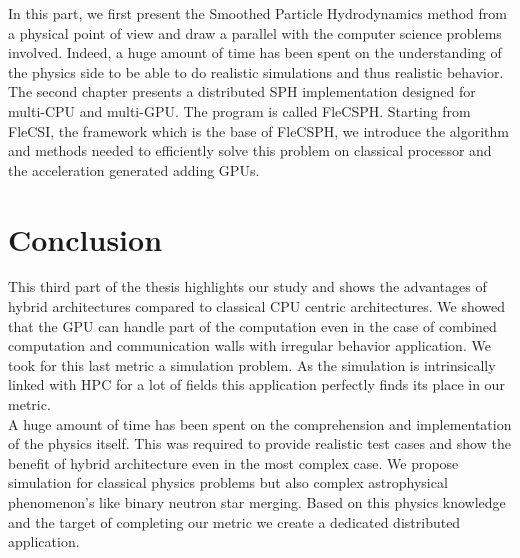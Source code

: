 In this part, we first present the Smoothed Particle Hydrodynamics method from a physical point of view and draw a parallel with the computer science problems involved. 
Indeed, a huge amount of time has been spent on the understanding of the physics side to be able to do realistic simulations and thus realistic behavior. 
The second chapter presents a distributed SPH implementation designed for multi-CPU and multi-GPU. 
The program is called FleCSPH. 
Starting from FleCSI, the framework which is the base of FleCSPH, we introduce the algorithm and methods needed to efficiently solve this problem on classical processor and the acceleration generated adding GPUs. 







\chapter*{Conclusion}
This third part of the thesis highlights our study and shows the advantages of hybrid architectures compared to classical CPU centric architectures. 
We showed that the GPU can handle part of the computation even in the case of combined computation and communication walls with irregular behavior application. 
We took for this last metric a simulation problem. 
As the simulation is intrinsically linked with HPC for a lot of fields this application perfectly finds its place in our metric.\\

A huge amount of time has been spent on the comprehension and implementation of the physics itself. 
This was required to provide realistic test cases and show the benefit of hybrid architecture even in the most complex case. 
We propose simulation for classical physics problems but also complex astrophysical phenomenon's like binary neutron star merging. 
Based on this physics knowledge and the target of completing our metric we create a dedicated distributed application.

